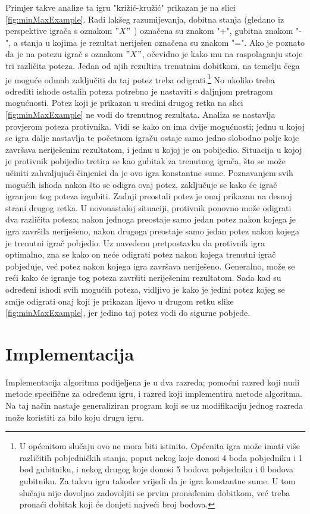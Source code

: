 \documentclass[times, utf8, seminar, numeric, tikz]{fer}
\begin{document}
Primjer takve analize ta igru "križić-kružić" prikazan je na slici \ref{fig:minMaxExample}. Radi lakšeg razumijevanja, dobitna stanja (gledano iz perspektive igrača s oznakom $"X"$ ) označena su znakom "+", gubitna znakom "-", a stanja u kojima je rezultat neriješen označena su znakom "=". Ako je poznato da je na potezu igrač s oznakom $"X"$, očevidno je kako mu na raspolaganju stoje tri različita poteza. Jedan od njih rezultira trenutnim dobitkom, na temelju čega je moguće odmah zaključiti da taj potez treba odigrati.\footnote{U općenitom slučaju ovo ne mora biti istinito. Općenita igra može imati više različitih pobjedničkih stanja, poput nekog koje donosi 4 boda pobjedniku i 1 bod gubitniku, i nekog drugog koje donosi 5 bodova pobjedniku i 0 bodova gubitniku. Za takvu igru također vrijedi da je igra konstantne sume. U tom slučaju nije dovoljno zadovoljiti se prvim pronađenim dobitkom, već treba pronaći dobitak koji će donjeti najveći broj bodova.} No ukoliko treba odrediti ishode ostalih poteza potrebno je nastaviti s daljnjom pretragom mogućnosti. Potez koji je prikazan u sredini drugog retka na slici \ref{fig:minMaxExample} ne vodi do trenutnog rezultata. Analiza se nastavlja provjerom poteza protivnika. Vidi se kako on ima dvije mogućnosti; jednu u kojoj se igra dalje nastavlja te početnom igraču ostaje samo jedno slobodno polje koje završava neriješenim rezultatom, i jednu u kojoj je on pobijedio. Situacija u kojoj je protivnik pobijedio tretira se kao gubitak za trenutnog igrača, što se može učiniti zahvaljujući činjenici da je ovo igra konstantne sume. Poznavanjem svih mogućih ishoda nakon što se odigra ovaj potez, zaključuje se kako će igrač igranjem tog poteza izgubiti. Zadnji preostali potez je onaj prikazan na desnoj strani drugog retka. U novonastaloj situaciji, protivnik ponovno može odigrati dva različita poteza; nakon jednoga preostaje samo jedan potez nakon kojega je igra završila neriješeno, nakon drugoga preostaje samo jedan potez nakon kojega je trenutni igrač pobjedio. Uz navedenu pretpostavku da protivnik igra optimalno, zna se kako on neće odigrati potez nakon kojega trenutni igrač pobjeđuje, već potez nakon kojega igra završava neriješeno. Generalno, može se reći kako će igranje tog poteza završiti neriješenim rezultatom. Sada kad su određeni ishodi svih mogućih poteza, vidljivo je kako je jedini potez kojeg se smije odigrati onaj koji je prikazan lijevo u drugom retku slike \ref{fig:minMaxExample}, jer jedino taj potez vodi do sigurne pobjede.

\section{Implementacija}
Implementacija algoritma podijeljena je u dva razreda; pomoćni razred koji nudi metode specifične za određenu igru, i razred koji implementira metode algoritma. Na taj način nastaje generaliziran program koji se uz modifikaciju jednog razreda može koristiti za bilo koju drugu igru.\\
\end{document}
